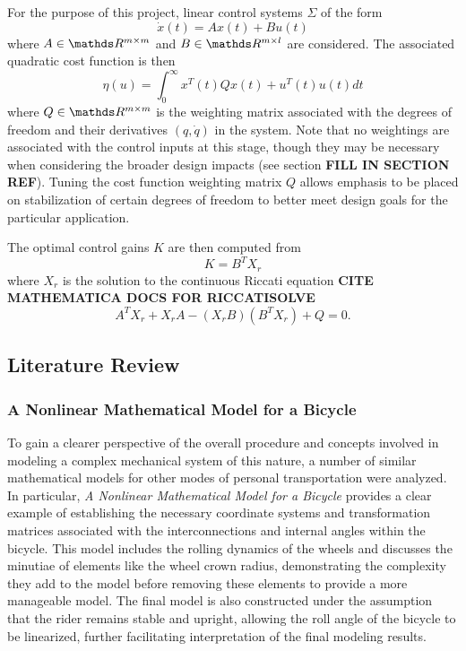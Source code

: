 For the purpose of this project, linear control systems $\Sigma$ of the form
\begin{equation}
\dot{x}(t) = Ax(t) + Bu(t)
\end{equation}
where $A \in \R^{m \times m}$ and $B \in \R^{m \times l}$ are considered.
The associated quadratic cost function is then 
\begin{equation}
\eta(u) = \int_{0}^{\infty}x^{T}(t)Qx(t)+u^{T}(t)u(t)dt
\end{equation}
where $Q \in \R^{m \times m}$ is the weighting matrix associated with the degrees of freedom and their derivatives $(q, \dot{q})$ in the system. Note that no weightings are associated with the control inputs at this stage, though they may be necessary when considering the broader design impacts (see section \textbf{FILL IN SECTION REF}). Tuning the cost function weighting matrix $Q$ allows emphasis to be placed on stabilization of certain degrees of freedom to better meet design goals for the particular application.

The optimal control gains $K$ are then computed from
\begin{equation}
K = B^{T}X_{r}
\end{equation}
where  $X_{r}$ is the solution to the continuous Riccati equation \textbf{CITE MATHEMATICA DOCS FOR RICCATISOLVE}
\begin{equation}
A^{T}X_{r} + X_{r}A - (X_{r}B)(B^{T}X_{r}) + Q = 0.
\end{equation}

\subsection{Literature Review}
\subsubsection{A Nonlinear Mathematical Model for a Bicycle}
To gain a clearer perspective of the overall procedure and concepts involved in modeling a complex mechanical system of this nature, a number of similar mathematical models for other modes of personal transportation were analyzed.
In particular, \textit{A Nonlinear Mathematical Model for a Bicycle} \cite{bicycle} provides a clear example of establishing the necessary coordinate systems and transformation matrices associated with the interconnections and internal angles within the bicycle.
This model includes the rolling dynamics of the wheels and discusses the minutiae of elements like the wheel crown radius, demonstrating the complexity they add to the model before removing these elements to provide a more manageable model.
The final model is also constructed under the assumption that the rider remains stable and upright, allowing the roll angle of the bicycle to be linearized, further facilitating interpretation of the final modeling results. 

